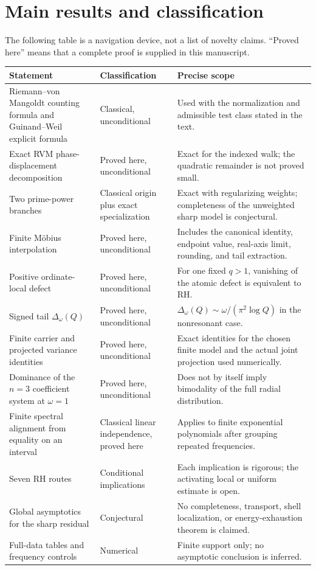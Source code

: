 \documentclass[11pt]{amsart}
\numberwithin{equation}{section}
\theoremstyle{plain}
\theoremstyle{definition}
\theoremstyle{remark}
\newcommand{\1}{\mathbf{1}}
\begin{document}
\section{Main results and classification}
\label{sec:main_results_status_map}

The following table is a navigation device, not a list of novelty claims.
``Proved here'' means that a complete proof is supplied in this manuscript.

\begin{center}
\begin{tabular}{>{\raggedright\arraybackslash}p{}
                >{\raggedright\arraybackslash}p{}
                >{\raggedright\arraybackslash}p{}}
\toprule
Statement & Classification & Precise scope \\
\midrule
Riemann--von Mangoldt counting formula and Guinand--Weil explicit formula
& Classical, unconditional
& Used with the normalization and admissible test class stated in the text. \\
Exact RVM phase-displacement decomposition
& Proved here, unconditional
& Exact for the indexed walk; the quadratic remainder is not proved small. \\
Two prime-power branches
& Classical origin plus exact specialization
& Exact with regularizing weights; completeness of the unweighted sharp model is conjectural. \\
Finite Möbius interpolation
& Proved here, unconditional
& Includes the canonical identity, endpoint value, real-axis limit, rounding, and tail extraction. \\
Positive ordinate-local defect
& Proved here, unconditional
& For one fixed \(q>1\), vanishing of the atomic defect is equivalent to RH. \\
Signed tail \(\Delta_\omega(Q)\)
& Proved here, unconditional
& \(\Delta_\omega(Q)\sim\omega/(\pi^2\log Q)\) in the nonresonant case. \\
Finite carrier and projected variance identities
& Proved here, unconditional
& Exact identities for the chosen finite model and the actual joint projection used numerically. \\
Dominance of the \(n=3\) coefficient system at \(\omega=1\)
& Proved here, unconditional
& Does not by itself imply bimodality of the full radial distribution. \\
Finite spectral alignment from equality on an interval
& Classical linear independence, proved here
& Applies to finite exponential polynomials after grouping repeated frequencies. \\
Seven RH routes
& Conditional implications
& Each implication is rigorous; the activating local or uniform estimate is open. \\
Global asymptotics for the sharp residual
& Conjectural
& No completeness, transport, shell localization, or energy-exhaustion theorem is claimed. \\
Full-data tables and frequency controls
& Numerical
& Finite support only; no asymptotic conclusion is inferred. \\
\bottomrule
\end{tabular}
\end{center}
\end{document}
